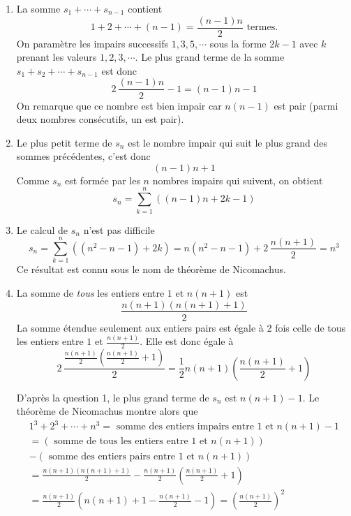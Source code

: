 \begin{enumerate}
 \item La somme $s_1 + \cdots + s_{n-1}$ contient 
\begin{displaymath}
 1 + 2 + \cdots + (n-1) = \frac{(n-1)n}{2} \text{ termes.}
\end{displaymath}
On paramètre les impairs successifs $1, 3, 5, \cdots$ sous la forme $2k-1$ avec $k$ prenant les valeurs $1, 2, 3, \cdots$. Le plus grand terme de la somme $s_1 + s_2 + \cdots + s_{n-1}$ est donc 
\begin{displaymath}
 2\,\frac{(n-1)n}{2} -1 = (n-1)n - 1
\end{displaymath}
On remarque que ce nombre est bien impair car $n(n-1)$ est pair (parmi deux nombres consécutifs, un est pair).

 \item Le plus petit terme de $s_n$ est le nombre impair qui suit le plus grand des sommes précédentes, c'est donc
\begin{displaymath}
 (n-1)n + 1
\end{displaymath}
Comme $s_n$ est formée par les $n$ nombres impairs qui suivent, on obtient
\begin{displaymath}
 s_n =  
\sum_{k=1}^n\left( (n-1)n + 2k-1\right)
\end{displaymath}

 \item Le calcul de $s_n$ n'est pas difficile
\begin{displaymath}
 s_n = \sum_{k=1}^n\left( (n^2-n-1) + 2k\right)
= n(n^2-n-1) + 2\,\frac{n(n+1)}{2}
= n^3
\end{displaymath}
Ce résultat est connu sous le nom de théorème de Nicomachus.

\item La somme de \emph{tous} les entiers entre $1$ et $n(n+1)$ est 
\begin{displaymath}
 \frac{n(n+1)\left( n(n+1)+1\right) }{2}
\end{displaymath}
La somme étendue seulement aux entiers pairs est égale à 2 fois celle de tous les entiers entre $1$ et $\frac{n(n+1)}{2}$. Elle est donc égale à
\begin{displaymath}
 2\,\frac{\frac{n(n+1)}{2}(\frac{n(n+1)}{2}+1)}{2}
 = \frac{1}{2}n(n+1)\left( \frac{n(n+1)}{2}+1\right) 
\end{displaymath}

D'après la question 1, le plus grand terme de $s_n$ est $n(n+1)-1$. Le théorème de Nicomachus montre alors que 
\begin{multline*}
 1^3 + 2^3 + \cdots + n^3
= \text{ somme des entiers impairs entre $1$ et $n(n+1)-1$}  \\
= \left( \text{ somme de tous les entiers entre $1$ et $n(n+1)$}\right) \\
- \left( \text{ somme des entiers pairs entre $1$ et $n(n+1)$}\right)\\
= \frac{n(n+1)\left( n(n+1)+1\right) }{2} - \frac{n(n+1)}{2}\left( \frac{n(n+1)}{2}+1\right)\\
= \frac{n(n+1)}{2}\left( n(n+1)+1 - \frac{n(n+1)}{2} - 1\right) 
= \left( \frac{n(n+1)}{2}\right)^2 
\end{multline*}

\end{enumerate}
